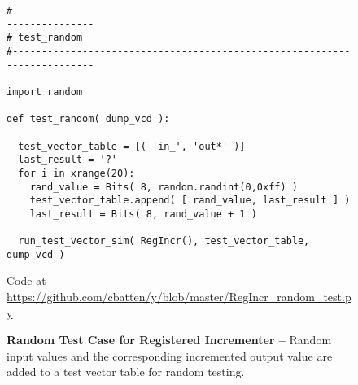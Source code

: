 
\begin{figure}[b]

  \begin{lstlisting}[xleftmargin={0.9in}]
#-------------------------------------------------------------------------
# test_random
#-------------------------------------------------------------------------

import random

def test_random( dump_vcd ):

  test_vector_table = [( 'in_', 'out*' )]
  last_result = '?'
  for i in xrange(20):
    rand_value = Bits( 8, random.randint(0,0xff) )
    test_vector_table.append( [ rand_value, last_result ] )
    last_result = Bits( 8, rand_value + 1 )

  run_test_vector_sim( RegIncr(), test_vector_table, dump_vcd )
\end{lstlisting}

  \centerline{\small Code at
    \url{https://github.com/cbatten/y/blob/master/RegIncr_random_test.py}}

  \caption{\textbf{Random Test Case for Registered Incrementer --} Random
    input values and the corresponding incremented output value are added
    to a test vector table for random testing.}
  \label{code-tut3-regincr-random-test}

\end{figure}


